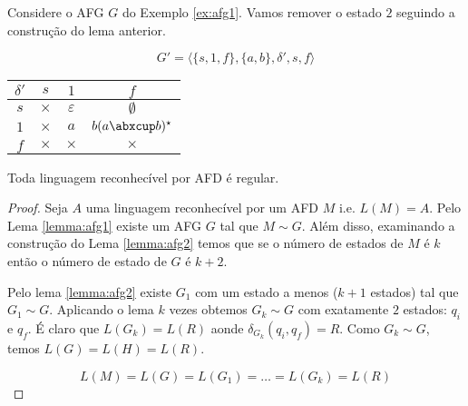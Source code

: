 \begin{example}
\label{ex:afg2}
Considere o AFG $G$ do Exemplo \ref{ex:afg1}.
Vamos remover o estado $2$ seguindo a construção do lema anterior.

\begin{displaymath}
  G' = \langle \{s, 1, f\}, \{a,b\}, \delta', s, f \rangle
\end{displaymath}

  \begin{center}
  \begin{tabular}{c|ccc}
    $\delta'$ & $s$      & $1$           & $f$           \\
    \hline
    $s$       & $\times$ & $\varepsilon$ & $\emptyset$   \\
    $1$       & $\times$ & $a$           & $b(a \abxcup b)^\star$  \\
    $f$       & $\times$ & $\times$      & $\times$       \\
  \end{tabular}
  \end{center}

\begin{center}
\end{center}

\end{example}

\begin{theorem}
Toda linguagem reconhecível por AFD é regular.
\end{theorem}
\begin{proof}
  Seja $A$ uma linguagem reconhecível por um AFD $M$ i.e. $L(M) = A$.
  Pelo Lema \ref{lemma:afg1} existe um AFG $G$ tal que $M \sim G$.
  Além disso, examinando a construção do Lema \ref{lemma:afg2} temos que se o número de estados de $M$ é $k$ então o número de estado de $G$ é $k+2$.

  Pelo lema \ref{lemma:afg2} existe $G_1$ com um estado a menos ($k + 1$ estados) tal que $G_1 \sim G$.
  Aplicando o lema $k$ vezes obtemos $G_k \sim G$ com exatamente $2$ estados: $q_i$ e $q_f$.
  É claro que $L(G_k) = L(R)$ aonde $\delta_{G_k}(q_i, q_f) = R$.
  Como $G_k \sim G$, temos $L(G) = L(H) = L(R)$.

  \begin{displaymath}
    L(M) = L(G) = L(G_1) = \dots = L(G_k) = L(R)
  \end{displaymath}
\end{proof}


